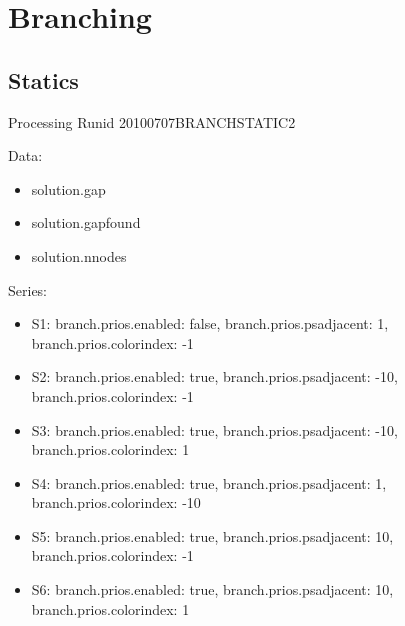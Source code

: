 \documentclass[landscape, 12pt]{report}
\begin{document}
	\clearpage
	
	\section{Branching}
	
	\subsection{Statics}
	
	Processing Runid 20100707BRANCHSTATIC2
	
	Data:
\begin{itemize}
\item solution.gap
\item solution.gapfound
\item solution.nnodes
\end{itemize}
Series:
\begin{itemize}
\item S1: branch.prios.enabled: false, branch.prios.psadjacent: 1, branch.prios.colorindex: -1
\item S2: branch.prios.enabled: true, branch.prios.psadjacent: -10, branch.prios.colorindex: -1
\item S3: branch.prios.enabled: true, branch.prios.psadjacent: -10, branch.prios.colorindex: 1
\item S4: branch.prios.enabled: true, branch.prios.psadjacent: 1, branch.prios.colorindex: -10
\item S5: branch.prios.enabled: true, branch.prios.psadjacent: 10, branch.prios.colorindex: -1
\item S6: branch.prios.enabled: true, branch.prios.psadjacent: 10, branch.prios.colorindex: 1
\end{itemize}
\end{document}
